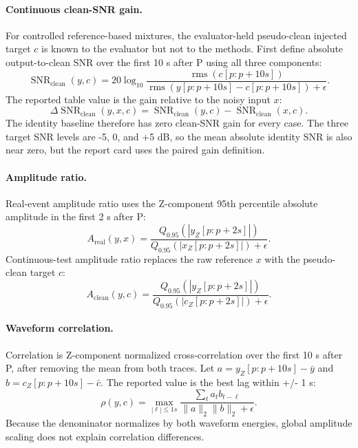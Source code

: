 \documentclass[review,12pt,authoryear]{elsarticle}
\begin{document}
\paragraph{Continuous clean-SNR gain.}
For controlled reference-based mixtures, the evaluator-held pseudo-clean injected target $c$ is known to the evaluator but not to the methods. First define absolute output-to-clean SNR over the first 10 s after P using all three components:
\begin{equation}
\operatorname{SNR}_{\operatorname{clean}}(y,c)
=20\log_{10}
\frac{\operatorname{rms}(c[p:p+10s])}
{\operatorname{rms}(y[p:p+10s]-c[p:p+10s])+\epsilon}.
\end{equation}
The reported table value is the gain relative to the noisy input $x$:
\begin{equation}
\Delta\operatorname{SNR}_{\operatorname{clean}}(y,x,c)
=\operatorname{SNR}_{\operatorname{clean}}(y,c)
-\operatorname{SNR}_{\operatorname{clean}}(x,c).
\end{equation}
The identity baseline therefore has zero clean-SNR gain for every case. The three target SNR levels are -5, 0, and +5 dB, so the mean absolute identity SNR is also near zero, but the report card uses the paired gain definition.

\paragraph{Amplitude ratio.}
Real-event amplitude ratio uses the Z-component 95th percentile absolute amplitude in the first 2 s after P:
\begin{equation}
A_{\operatorname{real}}(y,x)
=
\frac{Q_{0.95}(|y_Z[p:p+2s]|)}
{Q_{0.95}(|x_Z[p:p+2s]|)+\epsilon}.
\end{equation}
Continuous-test amplitude ratio replaces the raw reference $x$ with the pseudo-clean target $c$:
\begin{equation}
A_{\operatorname{clean}}(y,c)
=
\frac{Q_{0.95}(|y_Z[p:p+2s]|)}
{Q_{0.95}(|c_Z[p:p+2s]|)+\epsilon}.
\end{equation}

\paragraph{Waveform correlation.}
Correlation is Z-component normalized cross-correlation over the first 10 s after P, after removing the mean from both traces. Let $a=y_Z[p:p+10s]-\bar{y}$ and $b=c_Z[p:p+10s]-\bar{c}$. The reported value is the best lag within +/- 1 s:
\begin{equation}
\rho(y,c)=
\max_{|\ell|\le 1s}
\frac{\sum_t a_t b_{t-\ell}}
{\|a\|_2\|b\|_2+\epsilon}.
\end{equation}
Because the denominator normalizes by both waveform energies, global amplitude scaling does not explain correlation differences.
\end{document}
